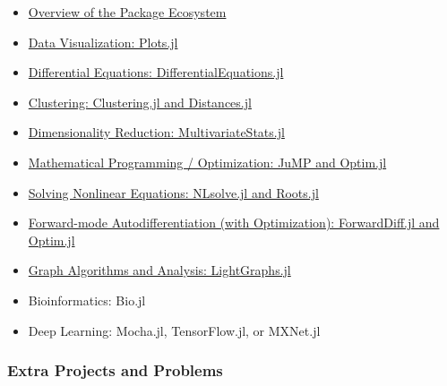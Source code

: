 \documentclass[11pt]{article}
\begin{document}
\begin{itemize}
\itemsep1pt\parskip0pt
\item
  \href{http://ucidatascienceinitiative.github.io/IntroToJulia/Slides/PackageEcosystem}{Overview
  of the Package Ecosystem}
\item
  \href{http://ucidatascienceinitiative.github.io/IntroToJulia/Slides/PlotsJL}{Data
  Visualization: Plots.jl}
\item
  \href{http://ucidatascienceinitiative.github.io/IntroToJulia/Slides/DiffEq}{Differential
  Equations: DifferentialEquations.jl}
\item
  \href{http://ucidatascienceinitiative.github.io/IntroToJulia/Html/Clustering}{Clustering:
  Clustering.jl and Distances.jl}
\item
  \href{http://ucidatascienceinitiative.github.io/IntroToJulia/Html/DimensionalityReduction}{Dimensionality
  Reduction: MultivariateStats.jl}
\item
  \href{http://ucidatascienceinitiative.github.io/IntroToJulia/Slides/Optimization}{Mathematical
  Programming / Optimization: JuMP and Optim.jl}
\item
  \href{http://ucidatascienceinitiative.github.io/IntroToJulia/Slides/NonlinearSolve}{Solving
  Nonlinear Equations: NLsolve.jl and Roots.jl}
\item
  \href{http://ucidatascienceinitiative.github.io/IntroToJulia/Slides/ForwardDiff}{Forward-mode
  Autodifferentiation (with Optimization): ForwardDiff.jl and Optim.jl}
\item
  \href{http://ucidatascienceinitiative.github.io/IntroToJulia/Slides/Graphs}{Graph
  Algorithms and Analysis: LightGraphs.jl}
\item
  Bioinformatics: Bio.jl
\item
  Deep Learning: Mocha.jl, TensorFlow.jl, or MXNet.jl
\end{itemize}

\subsubsection{Extra Projects and
Problems}\label{extra-projects-and-problems}
\end{document}
